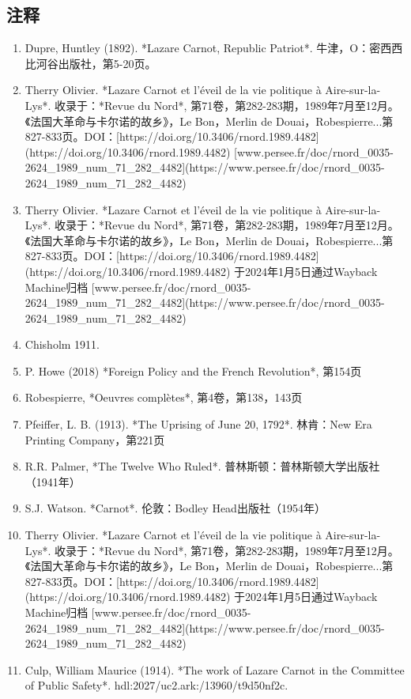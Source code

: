 \subsection{注释}  
\begin{enumerate}
\item Dupre, Huntley (1892). *Lazare Carnot, Republic Patriot*. 牛津，O：密西西比河谷出版社，第5-20页。  
\item Therry Olivier. *Lazare Carnot et l'éveil de la vie politique à Aire-sur-la-Lys*. 收录于：*Revue du Nord*, 第71卷，第282-283期，1989年7月至12月。《法国大革命与卡尔诺的故乡》，Le Bon，Merlin de Douai，Robespierre...第827-833页。DOI：[https://doi.org/10.3406/rnord.1989.4482](https://doi.org/10.3406/rnord.1989.4482) [www.persee.fr/doc/rnord_0035-2624_1989_num_71_282_4482](https://www.persee.fr/doc/rnord_0035-2624_1989_num_71_282_4482)  
\item Therry Olivier. *Lazare Carnot et l'éveil de la vie politique à Aire-sur-la-Lys*. 收录于：*Revue du Nord*, 第71卷，第282-283期，1989年7月至12月。《法国大革命与卡尔诺的故乡》，Le Bon，Merlin de Douai，Robespierre...第827-833页。DOI：[https://doi.org/10.3406/rnord.1989.4482](https://doi.org/10.3406/rnord.1989.4482) 于2024年1月5日通过Wayback Machine归档 [www.persee.fr/doc/rnord_0035-2624_1989_num_71_282_4482](https://www.persee.fr/doc/rnord_0035-2624_1989_num_71_282_4482)  
\item Chisholm 1911.  
\item P. Howe (2018) *Foreign Policy and the French Revolution*, 第154页  
\item Robespierre, *Oeuvres complètes*, 第4卷，第138，143页  
\item Pfeiffer, L. B. (1913). *The Uprising of June 20, 1792*. 林肯：New Era Printing Company，第221页  
\item R.R. Palmer, *The Twelve Who Ruled*. 普林斯顿：普林斯顿大学出版社（1941年）  
\item S.J. Watson. *Carnot*. 伦敦：Bodley Head出版社（1954年）  
\item Therry Olivier. *Lazare Carnot et l'éveil de la vie politique à Aire-sur-la-Lys*. 收录于：*Revue du Nord*, 第71卷，第282-283期，1989年7月至12月。《法国大革命与卡尔诺的故乡》，Le Bon，Merlin de Douai，Robespierre...第827-833页。DOI：[https://doi.org/10.3406/rnord.1989.4482](https://doi.org/10.3406/rnord.1989.4482) 于2024年1月5日通过Wayback Machine归档 [www.persee.fr/doc/rnord_0035-2624_1989_num_71_282_4482](https://www.persee.fr/doc/rnord_0035-2624_1989_num_71_282_4482)
\item Culp, William Maurice (1914). *The work of Lazare Carnot in the Committee of Public Safety*. hdl:2027/uc2.ark:/13960/t9d50nf2c.  

\end{enumerate}
